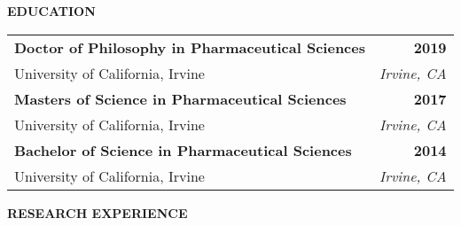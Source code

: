 %
\curriculumvitae
{

\textbf{EDUCATION}
  
  \begin{tabular*}{1\textwidth}{@{\extracolsep{\fill}}lr}
    \textbf{Doctor of Philosophy in Pharmaceutical Sciences} & \textbf{2019} \\
    \vspace{6pt}
    University of California, Irvine & \emph{Irvine, CA} \\
    \textbf{Masters of Science in Pharmaceutical Sciences} & \textbf{2017} \\
    \vspace{6pt}
    University of California, Irvine & \emph{Irvine, CA} \\
    \textbf{Bachelor of Science in Pharmaceutical Sciences} & \textbf{2014} \\
    \vspace{6pt}
    University of California, Irvine & \emph{Irvine, CA} \\
  \end{tabular*}

\vspace{12pt}
\textbf{RESEARCH EXPERIENCE}

}
